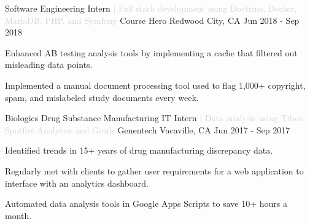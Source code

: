 

\begin{cventries}

  \cventry
  {Software Engineering Intern \textcolor{lightgray}{| Full stack development using Doctrine, Docker, MariaDB, PHP, and Symfony}}
  {Course Hero}
  {Redwood City, CA}
  {Jun 2018 - Sep 2018}
  {
  \begin{cvitems}
    \item {Enhanced AB testing analysis tools by implementing a cache that filtered out misleading data points.}
    \item {Implemented a manual document processing tool used to flag 1,000+ copyright, spam, and mislabeled study documents every week.}
  \end{cvitems}
  }

  \cventry
  {Biologics Drug Substance Manufacturing IT Intern \textcolor{lightgray}{| Data analysis using Tibco Spotfire Analytics and Grails} } %
  {Genentech} %
  {Vacaville, CA} %
  {Jun 2017 - Sep 2017} %
  {
  \begin{cvitems} %
    \item {Identified trends in 15+ years of drug manufacturing discrepancy data.}
    \item {Regularly met with clients to gather user requirements for a web application to interface with an analytics dashboard.}
    \item {Automated data analysis tools in Google Apps Scripts to save 10+ hours a month.}
  \end{cvitems}
  }
\end{cventries}
